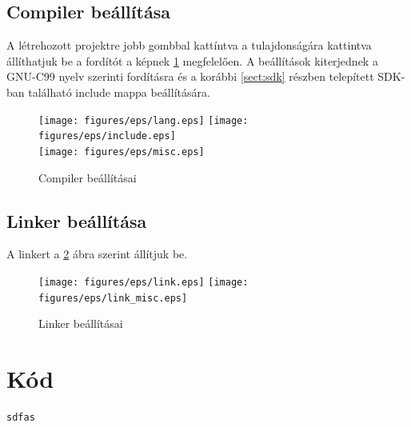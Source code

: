 \subsection{Compiler beállítása}
A létrehozott projektre jobb gombbal kattíntva a tulajdonságára kattintva
állíthatjuk be a fordítót a képnek \ref{fig:compiler} megfelelően.
A beállítások kiterjednek a GNU-C99 nyelv szerinti fordításra és a korábbi
\ref{sect:sdk} részben telepített SDK-ban található include mappa beállítására. 
\begin{figure}[H]
\centering
\texttt{[image: figures/eps/lang.eps]}\hspace{1cm}
\texttt{[image: figures/eps/include.eps]}\\\vspace{5mm}
\texttt{[image: figures/eps/misc.eps]}
\caption{Compiler beállításai} 
\label{fig:compiler}
\end{figure}

\subsection{Linker beállítása}
A linkert a \ref{fig:linker} ábra szerint állítjuk be.
\begin{figure}[H]
\centering
\texttt{[image: figures/eps/link.eps]}\hspace{1cm}
\texttt{[image: figures/eps/link\_misc.eps]}\\\vspace{5mm}
\caption{Linker beállításai} 
\label{fig:linker}
\end{figure}



\section{Kód}
\begin{lstlisting}[frame=single,float=!ht,caption=A fenti számozott felsorolás \LaTeX- forráskódja, label=listing:Example]
sdfas
\end{lstlisting}


